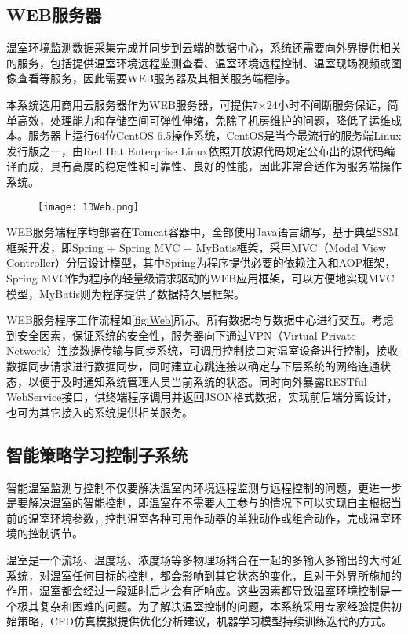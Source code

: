 	\subsection{WEB服务器}
温室环境监测数据采集完成并同步到云端的数据中心，系统还需要向外界提供相关的服务，包括提供温室环境远程监测查看、温室环境远程控制、温室现场视频或图像查看等服务，因此需要WEB服务器及其相关服务端程序。

本系统选用商用云服务器作为WEB服务器，可提供7×24小时不间断服务保证，简单高效，处理能力和存储空间可弹性伸缩，免除了机房维护的问题，降低了运维成本。服务器上运行64位CentOS 6.5操作系统，CentOS是当今最流行的服务端Linux发行版之一，由Red Hat Enterprise Linux依照开放源代码规定公布出的源代码编译而成，具有高度的稳定性和可靠性、良好的性能，因此非常合适作为服务端操作系统。
	\begin{figure}[!htp]
		\centering
		\texttt{[image: 13Web.png]}
	\end{figure}
WEB服务端程序均部署在Tomcat容器中，全部使用Java语言编写，基于典型SSM框架开发，即Spring + Spring MVC + MyBatis框架，采用MVC（Model View Controller）分层设计模型，其中Spring为程序提供必要的依赖注入和AOP框架，Spring MVC作为程序的轻量级请求驱动的WEB应用框架，可以方便地实现MVC模型，MyBatis则为程序提供了数据持久层框架。
 
WEB服务程序工作流程如\ref{fig:Web}所示。所有数据均与数据中心进行交互。考虑到安全因素，保证系统的安全性，服务器向下通过VPN（Virtual Private Network）连接数据传输与同步系统，可调用控制接口对温室设备进行控制，接收数据同步请求进行数据同步，同时建立心跳连接以确定与下层系统的网络连通状态，以便于及时通知系统管理人员当前系统的状态。同时向外暴露RESTful WebService接口，供终端程序调用并返回JSON格式数据，实现前后端分离设计，也可为其它接入的系统提供相关服务。

	\subsection{智能策略学习控制子系统}
智能温室监测与控制不仅要解决温室内环境远程监测与远程控制的问题，更进一步是要解决温室的智能控制，即温室在不需要人工参与的情况下可以实现自主根据当前的温室环境参数，控制温室各种可用作动器的单独动作或组合动作，完成温室环境的控制调节。

温室是一个流场、温度场、浓度场等多物理场耦合在一起的多输入多输出的大时延系统，对温室任何目标的控制，都会影响到其它状态的变化，且对于外界所施加的作用，温室都会经过一段延时后才会有所响应。这些因素都导致温室环境控制是一个极其复杂和困难的问题。为了解决温室控制的问题，本系统采用专家经验提供初始策略，CFD仿真模拟提供优化分析建议，机器学习模型持续训练迭代的方式。

